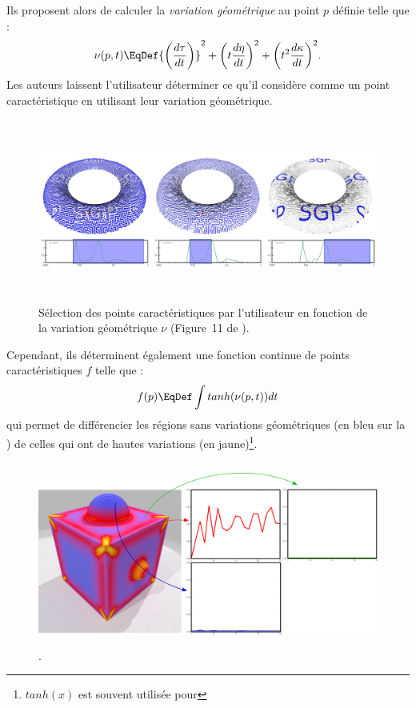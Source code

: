 Ils proposent alors de calculer la \emph{variation géométrique} au point $p$
définie telle que :
\begin{equation}
  \nu(p,t) \EqDef
  {\left(
    \frac{d\tau}{dt} \right)}^2
    + {\left( t\frac{d\eta}{dt}
  \right)}^2
  + {\left( t^2\frac{d\kappa}{dt} \right)}^2.
\end{equation}
Les auteurs laissent l'utilisateur déterminer ce qu'il considère comme un point
caractéristique en utilisant leur variation géométrique.

\begin{figure}[ht]{
    \begin{center}
    \includegraphics[height=6cm]{images/Feature/Mellado_multiscale}
    \end{center}}
    \caption[Sélection des points caractéristiques par l'utilisateur.]{Sélection des points caractéristiques par l'utilisateur en fonction de la variation géométrique $\nu$ (Figure~11 de \cite{Mellado2012}).
      \label{fig:mellado-multiscale}}
\end{figure}

Cependant, ils déterminent également une fonction continue de points
caractéristiques $f$ telle que :
\begin{equation}
   f(p) \EqDef \int tanh(\nu(p,t)) dt
\end{equation}
qui permet de différencier les régions sans variations géométriques (en bleu sur
la ) de celles qui ont de hautes variations
(en jaune)\footnote{$tanh(x)$ est souvent utilisée pour }.

\begin{figure}[ht]{
  \begin{center}
    \includegraphics[height=6cm]{figures/CubeSpherePlotMellado}
  \end{center}}
    \caption[.]{.
    \label{fig:mellado-cubesphere}}
\end{figure}

